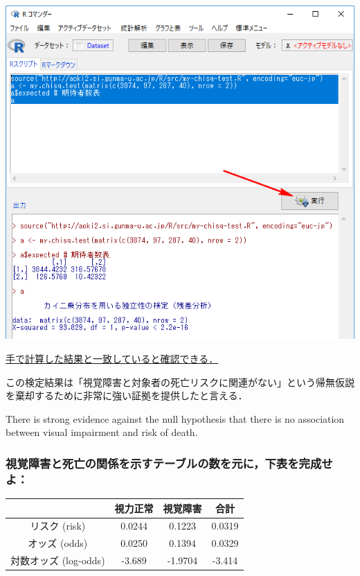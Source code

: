 \documentclass[11pt,]{problemset}
\begin{document}
\begin{center}\includegraphics[width=0.8\linewidth]{pic/mychisqtest01} \end{center}

\underline{手で計算した結果と一致していると確認できる．}

この検定結果は「視覚障害と対象者の死亡リスクに関連がない」という帰無仮説を棄却するために非常に強い証拠を提供したと言える．

There is strong evidence against the null hypothesis that there is no
association between visual impairment and risk of death.

\newpage
\vfill

\subsubsection{視覚障害と死亡の関係を示すテーブルの数を元に，下表を完成せよ：}

\begin{center}
\begin{tabular}{|c|c|c|c|}
\hline
                 & 視力正常   & 視覚障害    & 合計   \\ \hline
リスク (risk)       & 0.0244 & 0.1223  & 0.0319 \\ \hline
オッズ (odds)       & 0.0250 & 0.1394  & 0.0329 \\ \hline
対数オッズ (log-odds) & -3.689 & -1.9704 & -3.414 \\ \hline
\end{tabular}
\end{center}

\bigskip
\end{document}
